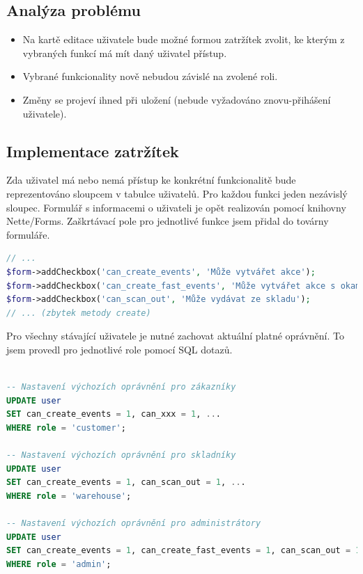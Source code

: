 \subsection{Analýza problému}

\begin{itemize}
    \item Na kartě editace uživatele bude možné formou zatržítek zvolit, ke kterým z vybraných funkcí má mít daný uživatel přístup.
    \item Vybrané funkcionality nově nebudou závislé na zvolené roli.
    \item Změny se projeví ihned při uložení (nebude vyžadováno znovu-přihášení uživatele).
\end{itemize}

\subsection{Implementace zatržítek}

Zda uživatel má nebo nemá přístup ke konkrétní funkcionalitě bude reprezentováno sloupcem v tabulce uživatelů. Pro každou funkci jeden nezávislý sloupec. Formulář s informacemi o uživateli je opět realizován pomocí knihovny Nette/Forms. Zaškrtávací pole pro jednotlivé funkce jsem přidal do továrny formuláře.

\begin{lstlisting}[language=php, label=src:UserFormFactory.php,caption={Úprava továrny pro formulář uživatelů }]
// ...
$form->addCheckbox('can_create_events', 'Může vytvářet akce');
$form->addCheckbox('can_create_fast_events', 'Může vytvářet akce s okamžitým odběrem');
$form->addCheckbox('can_scan_out', 'Může vydávat ze skladu');
// ... (zbytek metody create)

\end{lstlisting}

Pro všechny stávající uživatele je nutné zachovat aktuální platné oprávnění. To jsem provedl pro jednotlivé role pomocí SQL dotazů. 

\begin{lstlisting}[language=SQL,label=src:UserFormFactory.php,caption={Nastavení výchozích oprávnění pro jednotlivé role uživatelů}]

-- Nastavení výchozích oprávnění pro zákazníky
UPDATE user
SET can_create_events = 1, can_xxx = 1, ...
WHERE role = 'customer';

-- Nastavení výchozích oprávnění pro skladníky
UPDATE user
SET can_create_events = 1, can_scan_out = 1, ...
WHERE role = 'warehouse';

-- Nastavení výchozích oprávnění pro administrátory
UPDATE user
SET can_create_events = 1, can_create_fast_events = 1, can_scan_out = 1, ...
WHERE role = 'admin';

\end{lstlisting}


